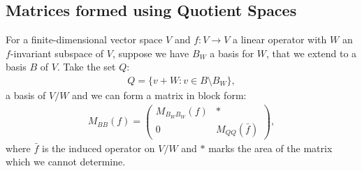 \subsection{Matrices formed using Quotient Spaces} \label{quotientmatrix}

For a finite-dimensional vector space $V$ and $f : V \to V$ a linear
operator with $W$ an $f$-invariant subspace of $V$, suppose we have 
$B_W$ a basis for $W$, that we extend to a basis $B$ of $V$.
Take the set $Q$: \begin{gather*}
  Q = \{v + W : v \in B \setminus B_W \},
\end{gather*} a basis of $V/W$ and we can form
a matrix in block form: \begin{gather*}
  M_{BB}(f) = \begin{pmatrix}
    M_{B_WB_W}(f) & * \\
    0 & M_{QQ}(\bar{f})
  \end{pmatrix},
\end{gather*} where $\bar{f}$ is the induced operator on $V/W$ and $*$
marks the area of the matrix which we cannot determine.